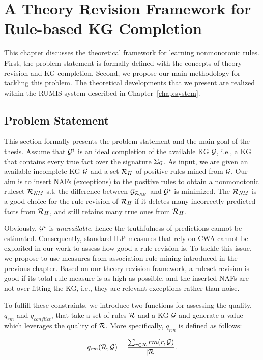 \chapter{A Theory Revision Framework for Rule-based KG Completion}
\label{chap:frame}

This chapter discusses the theoretical framework for learning nonmonotonic rules. First, the problem statement is formally defined with the concepts of theory revision and KG completion. Second, we propose our main methodology for tackling this problem. The theoretical developments that we present are realized within the RUMIS system described in Chapter~\ref{chap:system}.

\section{Problem Statement}

This section formally presents the problem statement and the main goal of the thesis. Assume that $\mathcal{G}^i$ is an ideal completion of the available KG $\mathcal{G}$, i.e., a KG that contains every true fact over the signature $\Sigma_{\mathcal{G}}$. As input, we are given an available incomplete KG $\mathcal{G}$ and a set $\mathcal{R}_H$ of positive rules mined from $\mathcal{G}$. Our aim is to insert NAFs (exceptions) to the positive rules to obtain a nonmonotonic ruleset $\mathcal{R}_{\mathit{NM}}$ s.t. the difference between $\mathcal{G}_{\mathcal{R}_{\mathit{NM}}}$ and $\mathcal{G}^i$ is minimized. The $\mathcal{R}_{\mathit{NM}}$ is a good choice for the rule revision of $\mathcal{R}_{\mathit{H}}$ if it deletes many incorrectly predicted facts from $\mathcal{R}_H$, and still retains many true ones from $\mathcal{R}_H$.

Obviously, $\mathcal{G}^i$ is \emph{unavailable}, hence the truthfulness of predictions cannot be estimated. Consequently, standard ILP measures that rely on CWA cannot be exploited in our work to assess how good a rule revision is. To tackle this issue, we propose to use measures from association rule mining introduced in the previous chapter. Based on our theory revision framework, a ruleset revision is good if its total rule measure is as high as possible, and the inserted NAFs are not over-fitting the KG, i.e., they are relevant exceptions rather than noise.

To fulfill these constraints, we introduce two functions for assessing the quality, $q_{rm}$ and $q_{conflict}$, that take a set of rules $\mathcal{R}$ and a KG $\mathcal{G}$ and generate a value which leverages the quality of $\mathcal{R}$. More specifically, $q_{rm}$ is defined as follows:

\begin{equation}
q_{\mathit{rm}}(\mathcal{R},\mathcal{G})=\dfrac{\sum_{r\in \mathcal{R}}rm(r,\mathcal{G})}{|\mathcal{R}|}.
\end{equation}

